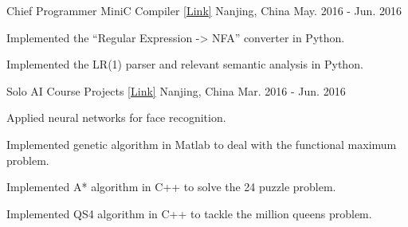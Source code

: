 \begin{cventries}
  \cventry
    {Chief Programmer} %
    {MiniC Compiler \href{https://github.com/seucs/compiler}{[\underline{Link}]}} %
    {Nanjing, China} %
    {May. 2016 - Jun. 2016} %
    {
      \begin{cvitems} %
        \item {Implemented the ``Regular Expression -> NFA'' converter in Python.}
        \item {Implemented the LR(1) parser and relevant semantic analysis in Python.}
      \end{cvitems}
    }

  \cventry
    {Solo} %
    {AI Course Projects \href{https://github.com/yanshengjia/artificial-intelligence}{[\underline{Link}]}} %
    {Nanjing, China} %
    {Mar. 2016 - Jun. 2016} %
    {
      \begin{cvitems} %
        \item {Applied neural networks for face recognition.}
        \item {Implemented genetic algorithm in Matlab to deal with the functional maximum problem.}
        \item {Implemented A* algorithm in C++ to solve the 24 puzzle problem.}
        \item {Implemented QS4 algorithm in C++ to tackle the million queens problem.}
      \end{cvitems}
    }




\end{cventries}
